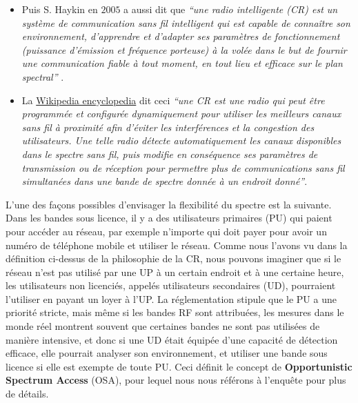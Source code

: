 \begin{resume_fr}
\begin{itemize}
    \item
    Puis S. Haykin en $2005$ a aussi dit que
    \emph{``une radio intelligente (CR) est un système de communication sans fil intelligent qui est capable de connaître son environnement, d'apprendre et d'adapter ses paramètres de fonctionnement (puissance d'émission et fréquence porteuse) à la volée dans le but de fournir une communication fiable à tout moment, en tout lieu et efficace sur le plan spectral''} \cite{Haykin05}.

    \item
    La \href{https://en.wikipedia.org/wiki/Cognitive_radio}{Wikipedia encyclopedia} dit ceci
    \emph{``une CR est une radio qui peut être programmée et configurée dynamiquement pour utiliser les meilleurs canaux sans fil à proximité afin d'éviter les interférences et la congestion des utilisateurs. Une telle radio détecte automatiquement les canaux disponibles dans le spectre sans fil, puis modifie en conséquence ses paramètres de transmission ou de réception pour permettre plus de communications sans fil simultanées dans une bande de spectre donnée à un endroit donné''}.
\end{itemize}

L'une des façons possibles d'envisager la flexibilité du spectre est la suivante.
%
Dans les bandes sous licence, il y a des utilisateurs primaires (PU) qui paient pour accéder au réseau, par exemple n'importe qui doit payer pour avoir un numéro de téléphone mobile et utiliser le réseau.
Comme nous l'avons vu dans la définition ci-dessus de la philosophie de la CR, nous pouvons imaginer que si le réseau n'est pas utilisé par une UP à un certain endroit et à une certaine heure, les utilisateurs non licenciés, appelés utilisateurs secondaires (UD), pourraient l'utiliser en payant un loyer à l'UP.
%
La réglementation stipule que le PU a une priorité stricte,
mais même si les bandes RF sont attribuées, les mesures dans le monde réel montrent souvent que certaines bandes ne sont pas utilisées de manière intensive, et donc si une UD était équipée d'une capacité de détection efficace, elle pourrait analyser son environnement, et utiliser une bande sous licence si elle est exempte de toute PU.
Ceci définit le concept de \textbf{Opportunistic Spectrum Access} (OSA), pour lequel nous nous référons à l'enquête \cite{Zhao07} pour plus de détails.



\end{resume_fr}
